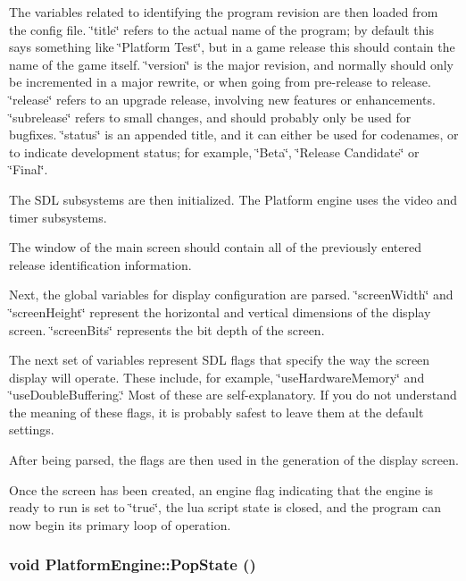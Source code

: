 The variables related to identifying the program revision are then loaded from the config file. \char`\"{}title\char`\"{} refers to the actual name of the program; by default this says something like \char`\"{}Platform Test\char`\"{}, but in a game release this should contain the name of the game itself. \char`\"{}version\char`\"{} is the major revision, and normally should only be incremented in a major rewrite, or when going from pre-release to release. \char`\"{}release\char`\"{} refers to an upgrade release, involving new features or enhancements. \char`\"{}subrelease\char`\"{} refers to small changes, and should probably only be used for bugfixes. \char`\"{}status\char`\"{} is an appended title, and it can either be used for codenames, or to indicate development status; for example, \char`\"{}Beta\char`\"{}, \char`\"{}Release Candidate\char`\"{} or \char`\"{}Final\char`\"{}.

The SDL subsystems are then initialized. The Platform engine uses the video and timer subsystems.

The window of the main screen should contain all of the previously entered release identification information.

Next, the global variables for display configuration are parsed. \char`\"{}screenWidth\char`\"{} and \char`\"{}screenHeight\char`\"{} represent the horizontal and vertical dimensions of the display screen. \char`\"{}screenBits\char`\"{} represents the bit depth of the screen.

The next set of variables represent SDL flags that specify the way the screen display will operate. These include, for example, \char`\"{}useHardwareMemory\char`\"{} and \char`\"{}useDoubleBuffering.\char`\"{} Most of these are self-explanatory. If you do not understand the meaning of these flags, it is probably safest to leave them at the default settings.

After being parsed, the flags are then used in the generation of the display screen.

Once the screen has been created, an engine flag indicating that the engine is ready to run is set to \char`\"{}true\char`\"{}, the lua script state is closed, and the program can now begin its primary loop of operation.\hypertarget{class_platform_engine_cf001abec596906465197d1220db2230}{
\subsubsection[{PopState}]{\setlength{\rightskip}{0pt plus 5cm}void PlatformEngine::PopState ()}}
\label{db/da1/class_platform_engine_cf001abec596906465197d1220db2230}


